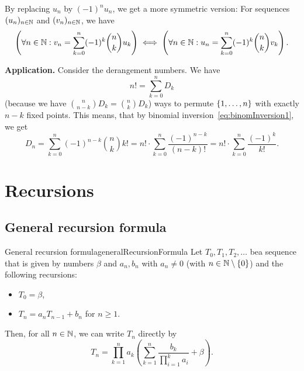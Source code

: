 \documentclass[language=english]{../../Template/TemplateLecture}
\begin{document}
\begin{beispiel}
\begin{enumerate}[$(i)$]
        By replacing $u_n$ by $(-1)^n u_n$, we get a more symmetric version: For sequences $(u_n)_{n \in \mathbb{N}}$ and $(v_n)_{n \in \mathbb{N}}$, we have 
        \begin{equation}
            \left(\forall n \in \mathbb{N}: v_n = \sum_{k = 0}^n (-1)^k \binom{n}{k} u_k\right) \iff \left( \forall n \in \mathbb{N}: u_n = \sum_{k = 0}^n (-1)^{k}\binom{n}{k} v_k \right).\label{eq:binomInversion2}
        \end{equation}
    \end{enumerate}
\end{beispiel}

\textbf{Application.} Consider the derangement numbers. We have 
\begin{equation}
    n! = \sum_{k = 0}^n D_k
\end{equation}
(because we have $\binom{n}{n-k} D_k = \binom{n}{k} D_k$) ways to permute $\{1,\ldots,n\}$ with exactly $n-k$ fixed points. This means, that by binomial inversion~\eqref{eq:binomInversion1}, we get
\begin{equation}
    D_n = \sum_{k = 0}^n (-1)^{n-k} \binom{n}{k} k! = n! \cdot \sum_{k = 0}^n \frac{(-1)^{n-k}}{(n-k)!} = n! \cdot \sum_{k = 0}^n \frac{(-1)^k}{k!}.
\end{equation}

\chapter{Recursions}
\section{General recursion formula}
\begin{thm}{General recursion formula}{generalRecursionFormula}
    Let $T_0, T_1, T_2, \ldots$ bea sequence that is given by numbers $\beta$ and $a_n, b_n$ with $a_n \neq 0$ (with $n \in \mathbb{N} \setminus \{0\}$) and the following recursions:
    \begin{itemize}
        \item $T_0 = \beta$,
        \item $T_n = a_n T_{n-1} + b_n$ for $n \geq 1$.
    \end{itemize}
    Then, for all $n \in \mathbb{N}$, we can write $T_n$ directly by 
    \begin{equation}
        T_n = \prod_{k = 1}^n a_k \left( \sum_{k = 1}^n \frac{b_k}{\prod_{i = 1}^k a_i} + \beta \right).
    \end{equation}
\end{thm}
\end{document}
